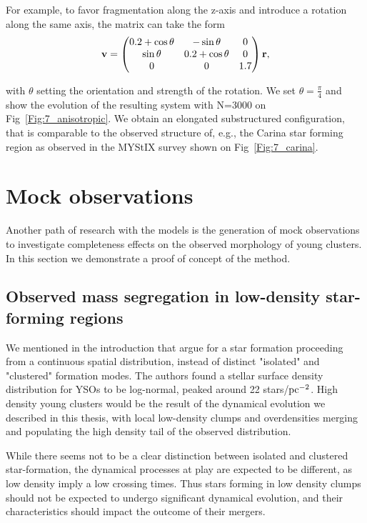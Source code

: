 For example, to favor fragmentation along the z-axis and introduce a rotation along the same axis, the matrix can take the form
\begin{equation}
\bold{v} = \left(\begin{matrix}
0.2 + \cos \theta &  -\sin \theta & 0\\
\sin \theta & 0.2 + \cos \theta & 0 \\
0  & 0 & 1.7\\
\end{matrix}\right) \bold{r},
\end{equation}

with $\theta$ setting the orientation and strength of the rotation. We set $\theta = \frac{\pi}{4}$ and show the evolution of the resulting system with N=3000 on Fig~\ref{Fig:7_anisotropic}. We obtain an elongated substructured configuration, that is comparable to the observed structure of, e.g., the Carina star forming region as observed in the MYStIX survey \citep{Kuhn2014} shown on Fig~\ref{Fig:7_carina}.



\section{Mock observations}

Another path of research with the \HubLem models is the generation of mock observations to investigate completeness effects on the observed morphology of young clusters. In this section we demonstrate a proof of concept of the method.

\subsection*{Observed mass segregation in low-density star-forming regions}

We mentioned in the introduction that \cite{Bressert2010} argue for a star formation proceeding from a continuous spatial distribution, instead of distinct "isolated" and "clustered" formation modes. The authors found a stellar surface density distribution for YSOs to be log-normal, peaked around 22 stars/${\textrm{pc}}^{-2}$.  High density young clusters would be the result of the dynamical evolution we described in this thesis, with local low-density clumps and overdensities merging and populating the high density tail of the observed distribution.

While there seems not to be a clear distinction between isolated and clustered star-formation, the dynamical processes at play are expected to be different, as low density imply a low crossing times. Thus stars forming in low density clumps should not be expected to undergo significant dynamical evolution, and their characteristics should impact the outcome of their mergers.

